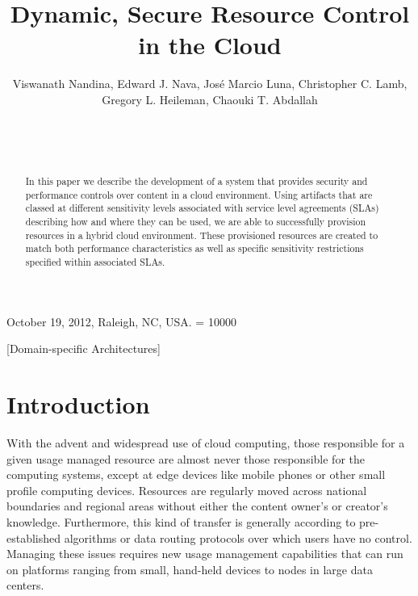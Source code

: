 \documentclass{sig-alternate}
\begin{document}
\title{Dynamic, Secure Resource Control in the Cloud}


\author{
\alignauthor
Viswanath Nandina, Edward J. Nava, Jos\'e Marcio Luna, Christopher C. Lamb, Gregory L. Heileman, Chaouki T. Abdallah\\
       \\
       \\
       \\
}

 {October 19, 2012, Raleigh, NC, USA.} 
\widowpenalty = 10000

\maketitle

\begin{abstract}
In this paper we describe the development of a system that provides security and performance controls over content in a cloud environment.  Using artifacts that are classed at different sensitivity levels associated with service level agreements (SLAs) describing how and where they can be used, we are able to successfully provision resources in a hybrid cloud environment.  These provisioned resources are created to match both performance characteristics as well as specific sensitivity restrictions specified within associated SLAs.
\end{abstract}

[Domain-specific Architectures]

\section{Introduction}\label{sec:introduction}
With the advent and widespread use of cloud computing, those responsible for a given usage managed resource are almost never those responsible for the computing systems, except at edge devices like mobile phones or other small profile computing devices.  Resources are regularly moved across national boundaries and regional areas without either the content owner's or creator's knowledge.  Furthermore, this kind of transfer is generally according to pre-established algorithms or data routing protocols over which users have no control.  Managing these issues requires new usage management capabilities that can run on platforms ranging from small, hand-held devices to nodes in large data centers.
\end{document}
